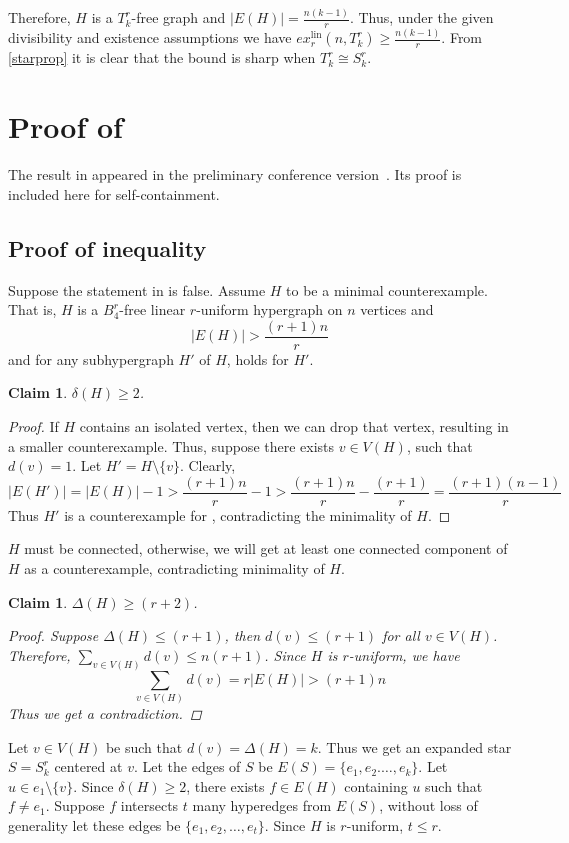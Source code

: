 \documentclass[11pt,a4paper]{article}
\newtheorem{claim}[theorem]{Claim}
\theoremstyle{definition}
\theoremstyle{remark}
\begin{document}
Therefore, $H$ is a $T^r_k$-free graph and $|E(H)|  = \frac{n(k-1)}{r}$. Thus, under the given divisibility and existence assumptions we have $ex_r^{\mathrm{lin}}(n,T_k^r) \geq \frac{n(k-1)}{r}$. From \cref{starprop} it is clear that the bound is sharp when $T^r_k \cong S^r_k$.  
    \section{Proof of }
The result in  appeared in the preliminary conference
version~\cite{AdakVerma2026}. Its proof is included here for
self-containment.\subsection{Proof of inequality}\label{ineqb4}
        Suppose the statement in  is false. Assume $H$ to be a minimal counterexample. That is, $H$ is a $B_4^r$-free linear $r$-uniform  hypergraph on $n$ vertices and   
        $$|E(H)| > \frac{(r+1)n}{r}$$
        and for any subhypergraph $H'$ of $H$,  holds for $H'$.
        \begin{claim}
            $\delta(H) \geq 2$.        \end{claim}
            \begin{proof}
                If $H$ contains an isolated vertex, then we can drop that vertex, resulting in a smaller counterexample. Thus, suppose there exists $v \in V(H)$, such that $d(v) =1$. Let $H' = H \setminus \{v\}$. Clearly, $$|E(H')| = |E(H)| -1 > \frac{(r+1)n}{r} -1 > \frac{(r+1)n}{r} - \frac{(r+1)}{r} = \frac{(r+1)(n-1)}{r}$$
                Thus $H'$ is a counterexample for , contradicting the minimality of $H$.
            \end{proof}

                    $H$ must be connected, otherwise, we will get at least one connected component of $H$ as a counterexample, contradicting minimality of $H$.
        \begin{claim}
            $\Delta(H) \geq (r+2)$.
            \begin{proof}
                Suppose $\Delta(H) \leq (r+1)$, then $d(v) \leq (r+1)$ for all $v \in V(H)$. Therefore, $\sum _{v \in V(H)}d(v) \leq n(r+1)$. Since $H$ is $r$-uniform, we have 
                $$\sum_{v\in V(H)}d(v) = r|E(H)| > (r+1)n$$
                Thus we get a contradiction.
            \end{proof}
        \end{claim}
        Let $v \in V(H)$ be such that $d(v) = \Delta(H) = k$. Thus we get an expanded star $S=S_k^r$ centered at $v$. Let the edges of $S$ be $E(S)=\{e_1,e_2.\dots,e_k\}$. Let $u \in e_1\setminus \{v\}$. Since $\delta(H) \geq 2$, there exists $f \in E(H)$ containing $u$ such that $f \neq e_1$. Suppose $f$ intersects $t$ many hyperedges from $E(S)$, without loss of generality let these edges be $\{e_1,e_2,\dots,e_t\}$. Since $H$ is $r$-uniform, $t \leq r$.
        
\end{document}
